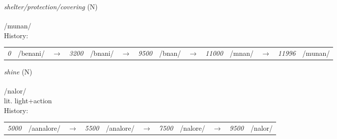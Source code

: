 \vspace{15pt}
\begin{nopagebreak}
 \textit{shelter/protection/covering} (N)\\
\\
\noindent /m{\textprimstress}unan/\\


\noindent History:

\vspace{-0pt}
\hspace{40pt}
\begin{tabular}{ccc}
\textit{0} & /benani/&$\rightarrow$ & \textit{3200} & /bnani/&$\rightarrow$ & \textit{9500} & /bnan/&$\rightarrow$ & \textit{11000} & /mnan/&$\rightarrow$ & \textit{11996} & /munan/& \\
\end{tabular}

\vspace{20pt}\hline

\end{nopagebreak}
\filbreak



\vspace{15pt}
\begin{nopagebreak}
 \textit{shine} (N)\\
\\
\noindent /n{\textprimstress}alor/\\
\noindent lit. light+action\\


\noindent History:

\vspace{-0pt}
\hspace{40pt}
\begin{tabular}{ccc}
\textit{5000} & /aanalore/&$\rightarrow$ & \textit{5500} & /analore/&$\rightarrow$ & \textit{7500} & /nalore/&$\rightarrow$ & \textit{9500} & /nalor/& \\
\end{tabular}

\vspace{20pt}\hline

\end{nopagebreak}
\filbreak



